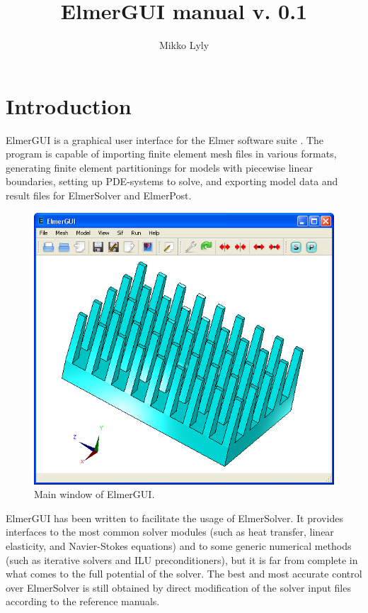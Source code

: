 \documentclass[a4paper,12pt]{article}
\title{ElmerGUI manual v. 0.1}
\author{Mikko Lyly}
\begin{document}
\maketitle

\newpage

\tableofcontents

\newpage

\section{Introduction}

ElmerGUI is a graphical user interface for the Elmer software suite
\cite{ElmerHome}. The program is capable of importing finite element mesh files in
various formats, generating finite element partitionings for models with piecewise linear
boundaries, setting up PDE-systems to solve, and exporting model data and result files
for ElmerSolver and ElmerPost.

\begin{figure}[ht]
\begin{center}
 \includegraphics[scale=0.5]{images/elmergui.png}
\caption{Main window of ElmerGUI.}
\end{center}
\end{figure}

ElmerGUI has been written to facilitate the usage of ElmerSolver. It provides interfaces
to the most common solver modules (such as heat transfer, linear elasticity, and
Navier-Stokes equations) and to some generic numerical methods (such as iterative solvers
and ILU preconditioners), but it is far from complete in what comes to the full potential
of the solver. The best and most accurate control over ElmerSolver is still obtained
by direct modification of the solver input files according to the reference manuals.
\end{document}
